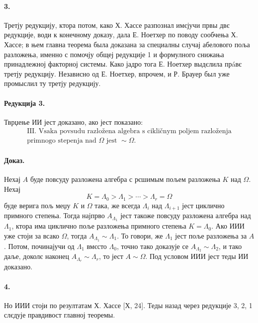 \documentclass[11pt]{article}
\begin{document}
\paragraph{3.}
Третју редукцију, ктора потом, како Х. Хассе разпознал имєјучи првы двє редукције, води к конечному доказу, дала Е. Ноетхер по поводу сообчења Х. Хассе; в њем главна теорема была доказана за специалны случај абелового поља разложења, именно с помочју общеј редукције 1 и формулного снижања принадлежној факторној системы. Како јадро тога Е. Ноетхер выдєлила прáвє третју редукцију. Независно од Е. Ноетхер, впрочем, и Р. Брауер был уже промыслил ту третју редукцију.

\paragraph{Редукција 3.}
Тврџење ИИ јест доказано, ако јест показано:
\[
\begin{gathered}\text{III. Vsaka povsudu razložena algebra s cikličnym poljem razloženja}\\\text{primnogo stepenja nad }\Omega\text{ jest }\sim\Omega .\end{gathered}
\]

\paragraph{Доказ.}
Нехај \(A\) буде повсуду разложена алгебра с рєшимым пољем разложења \(K\) над \(\Omega\). Нехај
\[
K=\Lambda_0>\Lambda_1>\cdots>\Lambda_r=\Omega
\]
буде верига пољ меџу \(K\) и \(\Omega\) така, же всегда \(\Lambda_i\) над \(\Lambda_{i+1}\) јест циклично примного степења. Тогда најпрво \(A_{\Lambda_1}\) јест такоже повсуду разложена алгебра над \(\Lambda_1\), ктора има циклично поље разложења примного степења \(K=\Lambda_0\). Ако ИИИ уже стоји за всако \(\Omega\), тогда \(A_{\Lambda_1}\sim \Lambda_1\). То говори, же \(\Lambda_1\) јест поље разложења за \(A\). Потом, починајучи од \(\Lambda_1\) вмєсто \(\Lambda_0\), точно тако доказује се \(A_{\Lambda_2}\sim\Lambda_2\), и тако даље, доколє наконец \(A_{\Lambda_r}\sim\Lambda_r\), то јест \(A\sim\Omega\). Под условом ИИИ јест теды ИИ доказано.

\paragraph{4.}
Но ИИИ стоји по резултатам Х. Хассе [Х, 24]. Теды назад через редукције 3, 2, 1 слєдује правдивост главној теоремы.
\end{document}

